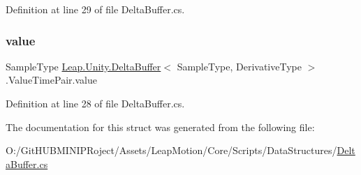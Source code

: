 Definition at line 29 of file Delta\+Buffer.\+cs.

\mbox{\label{struct_leap_1_1_unity_1_1_delta_buffer_1_1_value_time_pair_a85890d19a99a8075ae2bdda548d456e5}} 
\subsubsection{\texorpdfstring{value}{value}}
{\footnotesize\ttfamily Sample\+Type \mbox{\hyperlink{class_leap_1_1_unity_1_1_delta_buffer}{Leap.\+Unity.\+Delta\+Buffer}}$<$ Sample\+Type, Derivative\+Type $>$.Value\+Time\+Pair.\+value}



Definition at line 28 of file Delta\+Buffer.\+cs.



The documentation for this struct was generated from the following file\+:\begin{DoxyCompactItemize}
\item 
O\+:/\+Git\+H\+U\+B\+M\+I\+N\+I\+P\+Roject/\+Assets/\+Leap\+Motion/\+Core/\+Scripts/\+Data\+Structures/\mbox{\hyperlink{_delta_buffer_8cs}{Delta\+Buffer.\+cs}}\end{DoxyCompactItemize}
